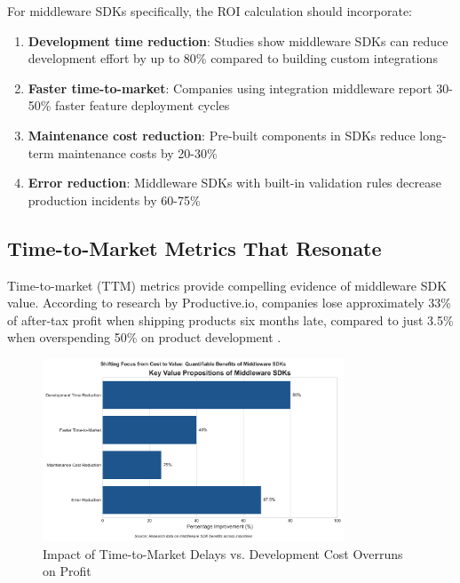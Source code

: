 \documentclass[11pt,a4paper]{article}
\begin{document}
For middleware SDKs specifically, the ROI calculation should incorporate:

\begin{enumerate}
    \item \textbf{Development time reduction}: Studies show middleware SDKs can reduce development effort by up to 80\% compared to building custom integrations \cite{prismatic2023}
    \item \textbf{Faster time-to-market}: Companies using integration middleware report 30-50\% faster feature deployment cycles \cite{aws2023}
    \item \textbf{Maintenance cost reduction}: Pre-built components in SDKs reduce long-term maintenance costs by 20-30\% \cite{haveignition2023}
    \item \textbf{Error reduction}: Middleware SDKs with built-in validation rules decrease production incidents by 60-75\% \cite{haveignition2023}
\end{enumerate}

\subsection{Time-to-Market Metrics That Resonate}

Time-to-market (TTM) metrics provide compelling evidence of middleware SDK value. According to research by Productive.io, companies lose approximately 33\% of after-tax profit when shipping products six months late, compared to just 3.5\% when overspending 50\% on product development \cite{productive2023}.

\begin{figure}[htbp]
    \centering
    \includegraphics[width=0.8\textwidth]{figures/visualization-20250510131736.png}
    \caption{Impact of Time-to-Market Delays vs. Development Cost Overruns on Profit}
    \label{fig:ttm-impact}
\end{figure}
\end{document}
